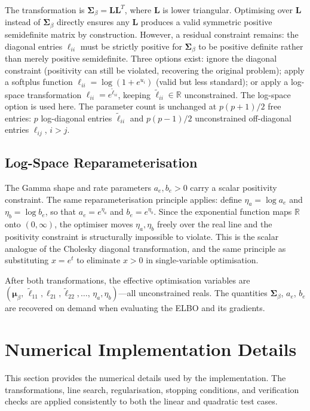 \documentclass[11pt,a4paper]{article}
\newcommand{\R}{\mathbb{R}}
\begin{document}
The transformation is $\bm{\Sigma}_\beta = \bm{L}\bm{L}^T$, where $\bm{L}$ is lower triangular. Optimising over $\bm{L}$ instead of $\bm{\Sigma}_\beta$ directly ensures any $\bm{L}$ produces a valid symmetric positive semidefinite matrix by construction. However, a residual constraint remains: the diagonal entries $\ell_{ii}$ must be strictly positive for $\bm{\Sigma}_\beta$ to be positive definite rather than merely positive semidefinite. Three options exist: ignore the diagonal constraint (positivity can still be violated, recovering the original problem); apply a softplus function $\ell_{ii} = \log(1 + e^{u_i})$ (valid but less standard); or apply a log-space transformation $\ell_{ii} = e^{\tilde{\ell}_{ii}}$, keeping $\tilde{\ell}_{ii} \in \R$ unconstrained. The log-space option is used here. The parameter count is unchanged at $p(p+1)/2$ free entries: $p$ log-diagonal entries $\tilde{\ell}_{ii}$ and $p(p-1)/2$ unconstrained off-diagonal entries $\ell_{ij}$, $i > j$.

\subsection*{Log-Space Reparameterisation}

The Gamma shape and rate parameters $a_e, b_e > 0$ carry a scalar positivity constraint. The same reparameterisation principle applies: define $\eta_a = \log a_e$ and $\eta_b = \log b_e$, so that $a_e = e^{\eta_a}$ and $b_e = e^{\eta_b}$. Since the exponential function maps $\R$ onto $(0, \infty)$, the optimiser moves $\eta_a, \eta_b$ freely over the real line and the positivity constraint is structurally impossible to violate. This is the scalar analogue of the Cholesky diagonal transformation, and the same principle as substituting $x = e^t$ to eliminate $x > 0$ in single-variable optimisation.

After both transformations, the effective optimisation variables are $(\bm{\mu}_\beta,\, \tilde{\ell}_{11}, \ell_{21}, \tilde{\ell}_{22}, \ldots,\, \eta_a, \eta_b)$---all unconstrained reals. The quantities $\bm{\Sigma}_\beta$, $a_e$, $b_e$ are recovered on demand when evaluating the ELBO and its gradients.

\newpage
\section*{Numerical Implementation Details}

This section provides the numerical details used by the implementation. The transformations, line search, regularisation, stopping conditions, and verification checks are applied consistently to both the linear and quadratic test cases.
\end{document}

